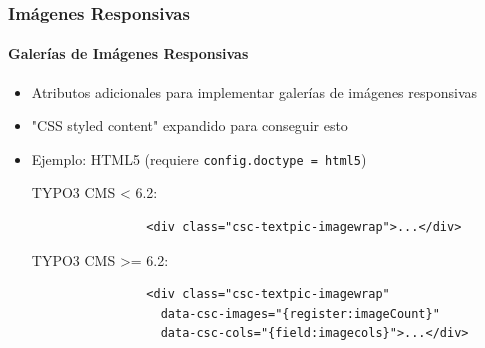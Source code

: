 \begin{frame}[fragile]
	\frametitle{Imágenes Responsivas}
	\framesubtitle{Galerías de Imágenes Responsivas}

	\begin{itemize}
		\item Atributos adicionales para implementar galerías de imágenes responsivas
		\item "CSS styled content" expandido para conseguir esto
		\item Ejemplo: HTML5 (requiere \texttt{config.doctype = html5})\newline

			TYPO3 CMS < 6.2:


			\begin{lstlisting}
				<div class="csc-textpic-imagewrap">...</div>
			\end{lstlisting}

			TYPO3 CMS >= 6.2:

			\begin{lstlisting}
				<div class="csc-textpic-imagewrap"
				  data-csc-images="{register:imageCount}"
				  data-csc-cols="{field:imagecols}">...</div>
			\end{lstlisting}

	\end{itemize}

\end{frame}


